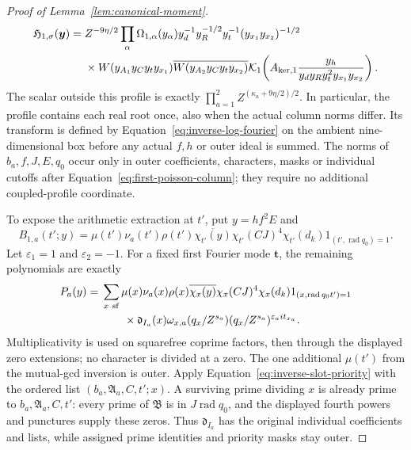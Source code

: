 \documentclass[12pt]{article}
\begin{document}
\begin{proof}[Proof of Lemma~\ref{lem:canonical-moment}]
\begin{equation}
 \begin{split}
 \mathfrak H_{1,\sigma}(\boldsymbol y)={}&Z^{-9\eta/2}
 \prod_\alpha\Omega_{1,\alpha}(y_\alpha)
 y_d^{-1}y_R^{-1/2}y_t^{-1}(y_{x_1}y_{x_2})^{-1/2}\\
 &\times W(y_{A_1}y_Cy_ty_{x_1})
       \overline{W(y_{A_2}y_Cy_ty_{x_2})}
 \mathcal K_1\!\left(A_{{\rm ker},1}
       \frac{y_h}{y_dy_Ry_t^2y_{x_1}y_{x_2}}\right).
 \end{split}
\end{equation}
The scalar outside this profile is exactly
\(\prod_{a=1}^2Z^{(\kappa_a+9\eta/2)/2}\).
In particular, the profile contains each real root once, also when the
actual column norms differ.  Its transform is defined by
Equation~\eqref{eq:inverse-log-fourier} on the ambient nine-dimensional
box before any actual \(f,h\) or outer ideal is summed.  The norms of
\(b_a,f,J,E,q_0\) occur only in outer coefficients, characters, masks
or individual cutoffs after Equation~\eqref{eq:first-poisson-column};
they require no additional coupled-profile coordinate.

To expose the arithmetic extraction at \(t'\), put \(y=hf^2E\) and
\[
 B_{1,a}(t';y)=\mu(t')\nu_a(t')\rho(t')\overline{\chi_{t'}(y)}
       \chi_{t'}(CJ)^4\chi_{t'}(d_k)1_{(t',\operatorname{rad}q_0)=1}.
\]
Let \(\varepsilon_1=1\) and \(\varepsilon_2=-1\).  For a fixed first
Fourier mode \(\boldsymbol t\), the remaining polynomials are exactly
\begin{equation}\label{eq:inverse-first-polynomial}
 \begin{split}
 P_a(y)={}&\sum_{x\ {\rm sf}}\mu(x)\nu_a(x)\rho(x)
       \overline{\chi_x(y)}\chi_x(CJ)^4\chi_x(d_k)
       1_{(x,\operatorname{rad}q_0t')=1}\\
 &\qquad\times\mathfrak d_{I_a}(x)\omega_{x,a}(q_x/Z^{s_a})
                  (q_x/Z^{s_a})^{\varepsilon_a it_{x_a}}.
 \end{split}
\end{equation}
Multiplicativity is used on squarefree coprime factors, then through
the displayed zero extensions; no character is divided at a zero.
The one additional \(\mu(t')\) from the mutual-gcd inversion is outer.
Apply Equation~\eqref{eq:inverse-slot-priority} with the ordered list
\((b_a,\mathfrak A_a,C,t';x)\).  A surviving prime dividing \(x\)
is already prime to \(b_a,\mathfrak A_a,C,t'\): every prime of
\(\mathfrak B\) is in \(J\operatorname{rad}q_0\), and the displayed
fourth powers and punctures supply these zeros.  Thus
\(\mathfrak d_{I_a}\) has the original individual coefficients and
lists, while assigned prime identities and priority masks stay outer.


\end{proof}
\end{document}
